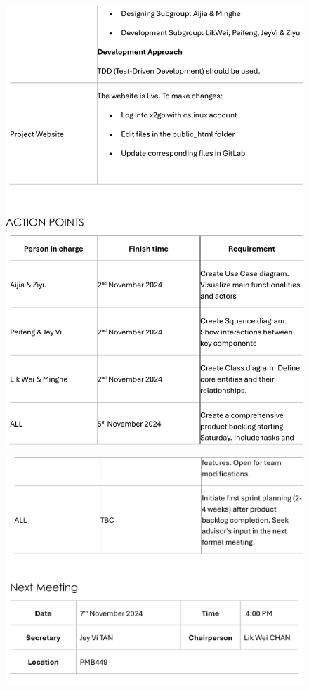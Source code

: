 \documentclass[a4paper,12pt, oneside]{report}
\begin{document}
\begin{appendices}
\begin{figure}[H]
    \includegraphics[width=\textwidth]{Minutes/Minutes_3-cropped-4.png}
\end{figure}
\newpage
\begin{figure}[H]
    \centering
    \includegraphics[width=\textwidth]{Minutes/Minutes_3-cropped-5.png}
\end{figure}


\end{appendices}
\end{document}
